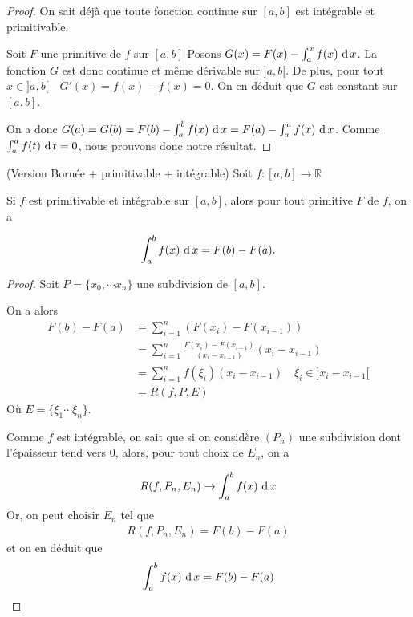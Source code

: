 \begin{proof}
    On sait déjà que toute fonction continue sur $[a,b]$ est intégrable et primitivable.

    Soit $F$ une primitive de $f$ sur $[a,b]$
    Posons $G(x) = F(x) - \int_a^xf(x)\,\operatorname{d} x $. La fonction $G$ est donc continue et même dérivable sur $]a,b[$. De plus, pour tout $x\in ]a,b[ \quad G'(x) = f(x) - f(x) = 0$.
    On en déduit que $G$ est constant sur $[a,b]$.

    On a donc $G(a) = G(b) = F(b) -\int_a^bf(x)\,\operatorname{d} x  =F(a) -\int_a^af(x)\,\operatorname{d} x$.
    Comme $\int_a^af(t)\,\operatorname{d} t = 0$, nous prouvons donc notre résultat.
    
\end{proof}

\begin{theoreme}{(Version Bornée + primitivable + intégrable)}
    Soit $f : [a,b] \to \mathbb{R}$ 

    Si $f$ est primitivable et intégrable sur $[a,b]$, alors pour tout primitive $F$ de $f$, on a 
    
    \begin{align*}
        \int_a^bf(x)\,\operatorname{d} x = F(b) - F(a).
    \end{align*}
\end{theoreme}

\begin{proof}
    Soit $P = \{ x_0,\cdots x_n\}$ une subdivision de $[a,b]$.

    On a alors 
    \begin{align*}
        F(b) - F(a) &= \sum_{i=1}^n (F(x_i)-F(x_{i-1}))\\
        &=\sum_{i=1}^n \frac{F(x_i)-F(x_{i-1})}{(x_i-x_{i-1})}(x_i-x_{i-1}) \\
        &= \sum_{i=1}^nf(\xi_i)(x_i-x_{i-1}) \quad \xi_i \in ]x_i-x_{i-1}[ \\
        &= R(f,P,E) 
    \end{align*}
    Où $E = \{\xi_1\cdots \xi_n\}$.

    Comme $f$ est intégrable, on sait que si on considère $(P_n)$ une subdivision dont l'épaisseur tend vers $0$, alors, pour tout choix de $E_n$, on a 

    \begin{align*}
        R(f,P_n,E_n) \to \int_a^b f(x) \,\operatorname{d} x
    \end{align*}
    Or, on peut choisir $E_n$ tel que 
    \begin{align*}
        R(f,P_n,E_n) = F(b) - F(a)
    \end{align*}
    et on en déduit que 
    \begin{align*}
        \int_a^bf(x)\,\operatorname{d} x = F(b) -F(a)
    \end{align*}
\end{proof}

